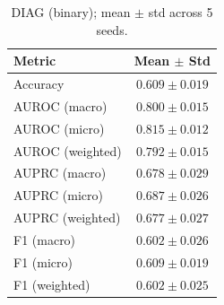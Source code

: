 \begin{table}[h]
\centering
\begin{tabular}{l|c}
\hline
Metric & Mean $\pm$ Std \\
\hline
Accuracy & $0.609 \pm 0.019$ \\
AUROC (macro) & $0.800 \pm 0.015$ \\
AUROC (micro) & $0.815 \pm 0.012$ \\
AUROC (weighted) & $0.792 \pm 0.015$ \\
AUPRC (macro) & $0.678 \pm 0.029$ \\
AUPRC (micro) & $0.687 \pm 0.026$ \\
AUPRC (weighted) & $0.677 \pm 0.027$ \\
F1 (macro) & $0.602 \pm 0.026$ \\
F1 (micro) & $0.609 \pm 0.019$ \\
F1 (weighted) & $0.602 \pm 0.025$ \\
\hline
\end{tabular}
\caption{DIAG (binary); mean $\pm$ std across 5 seeds.}
\end{table}
